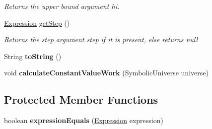 \begin{DoxyCompactItemize}
\begin{DoxyCompactList}\small\item\em Returns the upper bound argument {\ttfamily hi}. \end{DoxyCompactList}\item 
\hyperlink{interfaceedu_1_1udel_1_1cis_1_1vsl_1_1civl_1_1model_1_1IF_1_1expression_1_1Expression}{Expression} \hyperlink{classedu_1_1udel_1_1cis_1_1vsl_1_1civl_1_1model_1_1common_1_1expression_1_1CommonRegularRangeExpression_a3acd72d42f98076e58ca3d730e5bf980}{get\+Step} ()
\begin{DoxyCompactList}\small\item\em Returns the step argument {\ttfamily step} if it is present, else returns {\ttfamily null} \end{DoxyCompactList}\item 
\hypertarget{classedu_1_1udel_1_1cis_1_1vsl_1_1civl_1_1model_1_1common_1_1expression_1_1CommonRegularRangeExpression_a886bee74955d512c16b4a68efd0b3fef}{}String {\bfseries to\+String} ()\label{classedu_1_1udel_1_1cis_1_1vsl_1_1civl_1_1model_1_1common_1_1expression_1_1CommonRegularRangeExpression_a886bee74955d512c16b4a68efd0b3fef}

\item 
\hypertarget{classedu_1_1udel_1_1cis_1_1vsl_1_1civl_1_1model_1_1common_1_1expression_1_1CommonRegularRangeExpression_a1aaf88d37d9b51943bbd427cca319202}{}void {\bfseries calculate\+Constant\+Value\+Work} (Symbolic\+Universe universe)\label{classedu_1_1udel_1_1cis_1_1vsl_1_1civl_1_1model_1_1common_1_1expression_1_1CommonRegularRangeExpression_a1aaf88d37d9b51943bbd427cca319202}

\end{DoxyCompactItemize}
\subsection*{Protected Member Functions}
\begin{DoxyCompactItemize}
\item 
\hypertarget{classedu_1_1udel_1_1cis_1_1vsl_1_1civl_1_1model_1_1common_1_1expression_1_1CommonRegularRangeExpression_affec9cbe2b2a0d10800ff25350c5856c}{}boolean {\bfseries expression\+Equals} (\hyperlink{interfaceedu_1_1udel_1_1cis_1_1vsl_1_1civl_1_1model_1_1IF_1_1expression_1_1Expression}{Expression} expression)\label{classedu_1_1udel_1_1cis_1_1vsl_1_1civl_1_1model_1_1common_1_1expression_1_1CommonRegularRangeExpression_affec9cbe2b2a0d10800ff25350c5856c}

\end{DoxyCompactItemize}
